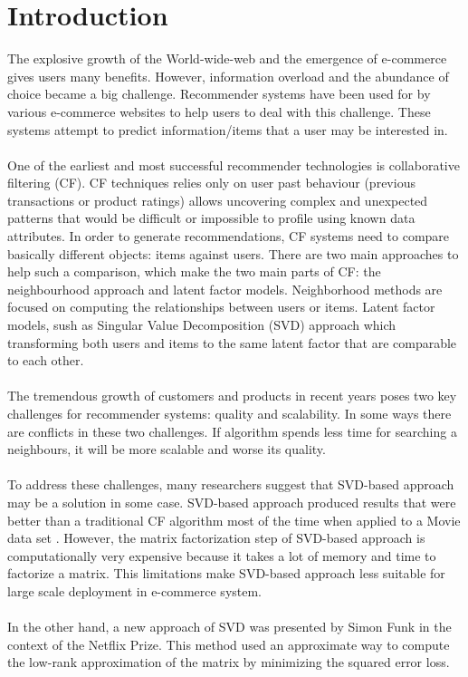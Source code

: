 \documentclass[conference]{IEEEtran}
\begin{document}
\section{Introduction}
The explosive growth of the World-wide-web and the emergence of e-commerce gives users many benefits. However, information overload and the abundance of choice became a big challenge. Recommender systems have been used for by various e-commerce websites to help users to deal with this challenge. These systems attempt to predict information/items that a user may be interested in. 
\\\\
One of the earliest and most successful recommender technologies is collaborative
filtering (CF). CF techniques relies only on user past behaviour (previous transactions or product ratings)  allows uncovering complex and unexpected patterns that would be difficult or impossible to profile using known data attributes. In order to generate recommendations, CF systems need to compare basically different objects: items against users. There are two main approaches to help such a comparison, which make the two main parts of CF: the neighbourhood approach and latent factor models. Neighborhood methods are focused on computing the relationships between users or items. Latent factor models, sush as Singular Value Decomposition (SVD) approach which transforming both users and items to the same latent factor that are comparable to each other.
\\\\
The tremendous growth of customers and products in recent years poses  two key challenges for recommender systems: quality and scalability. In some ways there are conflicts in these two challenges. If algorithm spends less time for searching a neighbours, it will be more scalable and worse its quality.
\\\\
To address these challenges, many researchers suggest that SVD-based approach may be a solution in some case. SVD-based approach produced results that were better than a traditional CF algorithm most of the time when applied to a Movie data set \cite{SarwarApplication}. However, the matrix factorization step of SVD-based approach is computationally very expensive because it takes a lot of memory and time to factorize a matrix. This limitations make SVD-based approach less suitable for large scale deployment in e-commerce system.
\\\\
In the other hand, a new approach of SVD was presented by Simon Funk in the context of the Netflix Prize\cite{SimonFunk}. This method used an approximate way to compute the low-rank approximation of the matrix by minimizing the squared error loss.
\end{document}
